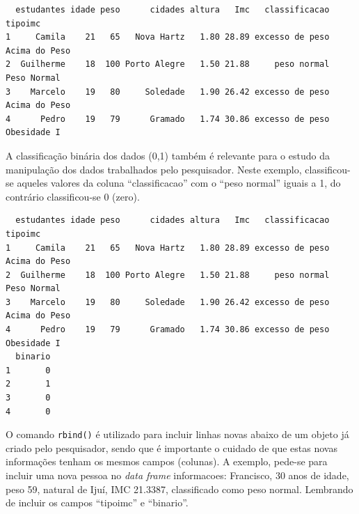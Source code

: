 \documentclass[12pt,brazil,]{book}
\newenvironment{Shaded}{\begin{snugshade}}{\end{snugshade}}
\newcommand{\CommentTok}[1]{\textcolor[rgb]{0.56,0.35,0.01}{\textit{#1}}}
\newcommand{\DecValTok}[1]{\textcolor[rgb]{0.00,0.00,0.81}{#1}}
\newcommand{\KeywordTok}[1]{\textcolor[rgb]{0.13,0.29,0.53}{\textbf{#1}}}
\newcommand{\NormalTok}[1]{#1}
\newcommand{\OperatorTok}[1]{\textcolor[rgb]{0.81,0.36,0.00}{\textbf{#1}}}
\newcommand{\StringTok}[1]{\textcolor[rgb]{0.31,0.60,0.02}{#1}}
\begin{document}
\begin{verbatim}
  estudantes idade peso      cidades altura   Imc   classificacao       tipoimc
1     Camila    21   65   Nova Hartz   1.80 28.89 excesso de peso Acima do Peso
2  Guilherme    18  100 Porto Alegre   1.50 21.88     peso normal   Peso Normal
3    Marcelo    19   80     Soledade   1.90 26.42 excesso de peso Acima do Peso
4      Pedro    19   79      Gramado   1.74 30.86 excesso de peso   Obesidade I
\end{verbatim}

A classificação binária dos dados (0,1) também é relevante para o estudo
da manipulação dos dados trabalhados pelo pesquisador. Neste exemplo,
classificou-se aqueles valores da coluna ``classificacao'' com o ``peso
normal'' iguais a 1, do contrário classificou-se 0 (zero).

\begin{Shaded}
\end{Shaded}

\begin{verbatim}
  estudantes idade peso      cidades altura   Imc   classificacao       tipoimc
1     Camila    21   65   Nova Hartz   1.80 28.89 excesso de peso Acima do Peso
2  Guilherme    18  100 Porto Alegre   1.50 21.88     peso normal   Peso Normal
3    Marcelo    19   80     Soledade   1.90 26.42 excesso de peso Acima do Peso
4      Pedro    19   79      Gramado   1.74 30.86 excesso de peso   Obesidade I
  binario
1       0
2       1
3       0
4       0
\end{verbatim}

O comando \texttt{rbind()} é utilizado para incluir linhas novas abaixo
de um objeto já criado pelo pesquisador, sendo que é importante o
cuidado de que estas novas informações tenham os mesmos campos
(colunas). A exemplo, pede-se para incluir uma nova pessoa no \emph{data
frame} informacoes: Francisco, 30 anos de idade, peso 59, natural de
Ijuí, IMC 21.3387, classificado como peso normal. Lembrando de incluir
os campos ``tipoimc'' e ``binario''.
\end{document}
